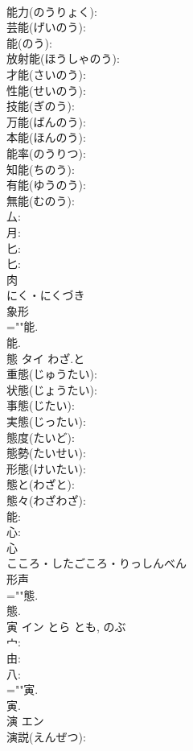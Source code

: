 \documentclass[8pt]{extreport}
\begin{document}
\begin{CJK}{UTF8}{min}
\\	能力(のうりょく): 
\\	芸能(げいのう): 
\\	能(のう): 
\\	放射能(ほうしゃのう): 
\\	才能(さいのう): 
\\	性能(せいのう): 
\\	技能(ぎのう): 
\\	万能(ばんのう): 
\\	本能(ほんのう): 
\\	能率(のうりつ): 
\\	知能(ちのう): 
\\	有能(ゆうのう): 
\\	無能(むのう): 
\\	厶: 
\\	月: 
\\	匕: 
\\	匕: 
\\	肉	
\\	にく・にくづき	
\\	象形 
\\	=""能.
\\	能.
\\	態	タイ	わざ.と		
\\	重態(じゅうたい): 
\\	状態(じょうたい): 
\\	事態(じたい): 
\\	実態(じったい): 
\\	態度(たいど): 
\\	態勢(たいせい): 
\\	形態(けいたい): 
\\	態と(わざと): 
\\	態々(わざわざ): 
\\	能: 
\\	心: 
\\	心	
\\	こころ・したごころ・りっしんべん	
\\	形声 
\\	=""態.
\\	態.
\\	寅	イン	とら	とも, のぶ	
\\	宀: 
\\	由: 
\\	八: 
\\	=""寅.
\\	寅.
\\	演	エン			
\\	演説(えんぜつ): 

\end{CJK}
\end{document}
